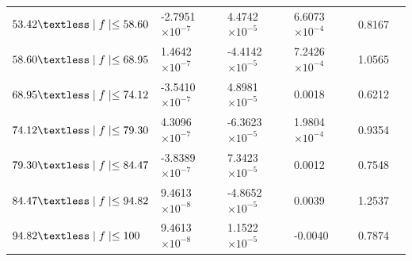 \documentclass[journal]{IEEEtran}
\begin{document}
\begin{table}[h]
\begin{tabular}{|C{4cm}|C{3cm}|C{3cm}|C{3cm}|C{3cm}|m{0cm}}
		$53.42\textless \mid f\mid \leq 58.60$ & -2.7951 $\times 10^{-7}$ & 4.4742 $\times 10^{-5}$  & 6.6073 $\times 10^{-4}$  & 0.8167 &\\ 
		$58.60\textless \mid f\mid \leq 68.95$ & 1.4642  $\times 10^{-7}$ & -4.4142 $\times 10^{-5}$ & 7.2426 $\times 10^{-4}$  & 1.0565 &\\ 
		$68.95\textless \mid f\mid \leq 74.12$ & -3.5410 $\times 10^{-7}$ & 4.8981 $\times 10^{-5}$  & 0.0018 					& 0.6212 &\\ 
		$74.12\textless \mid f\mid \leq 79.30$ & 4.3096  $\times 10^{-7}$ & -6.3623 $\times 10^{-5}$ & 1.9804 $\times 10^{-4}$  & 0.9354 &\\ 
		$79.30\textless \mid f\mid \leq 84.47$ & -3.8389 $\times 10^{-7}$ & 7.3423 $\times 10^{-5}$  & 0.0012					& 0.7548 &\\ 
		$84.47\textless \mid f\mid \leq 94.82$ & 9.4613 $\times 10^{-8}$  & -4.8652 $\times 10^{-5}$ & 0.0039 					& 1.2537 &\\ 
		$94.82\textless \mid f\mid \leq 100$   & 9.4613  $\times 10^{-8}$ & 1.1522 $\times 10^{-5}$  & -0.0040					& 0.7874 &\\ 
	\end{tabular}
\end{table}
\end{document}
